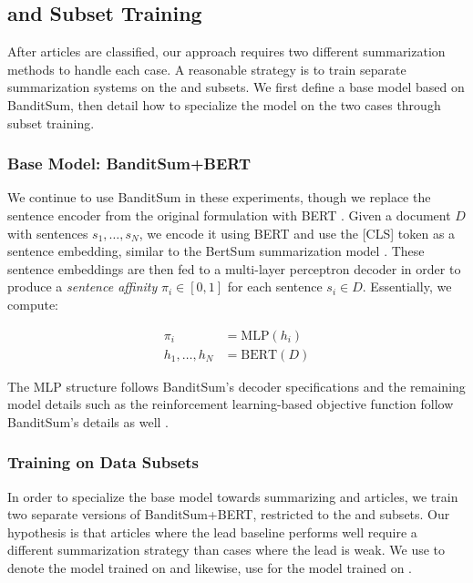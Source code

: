 \subsection{\Dearly{} and \Dlate{} Subset Training}
After articles are classified, our approach requires two different summarization methods to handle each case. A reasonable strategy is to train separate summarization systems on the \Dearly{} and \Dlate{} subsets. We first define a base model based on BanditSum, then detail how to specialize the model on the two cases through subset training.

\subsubsection{Base Model: BanditSum+BERT}
We continue to use BanditSum in these experiments, though we replace the sentence encoder from the original formulation with BERT \parencite{bert}. Given a document $D$ with sentences $s_1,\dots,s_N$, we encode it using BERT and use the [CLS] token as a sentence embedding, similar to the BertSum summarization model \parencite{bertsum}. These sentence embeddings are then fed to a multi-layer perceptron decoder in order to produce a \textit{sentence affinity} $\pi_i \in [0, 1]$ for each sentence $s_i \in D$. Essentially, we compute:

\begin{align}
    \pi_i &= \mathrm{MLP}(h_i) \\
    h_1,\dots,h_N &= \mathrm{BERT}(D)
\end{align}

The MLP structure follows BanditSum's decoder specifications and the remaining model details such as the reinforcement learning-based objective function follow BanditSum's details as well \parencite{dong2018banditsum}.

\subsubsection{Training on Data Subsets}
In order to specialize the base model towards summarizing \Dearly{} and \Dlate{} articles, we train two separate versions of BanditSum+BERT, restricted to the \Dearly{} and \Dlate{} subsets. Our hypothesis is that articles where the lead baseline performs well require a different summarization strategy than cases where the lead is weak. We use \BanSumEarly{} to denote the model trained on \Dearly{} and likewise, use \BanSumLate{} for the model trained on \Dlate{}.

